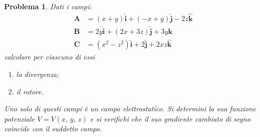\documentclass[a4paper,oneside]{article}
\newtheorem{problema}{Problema}
\renewcommand{\vec}[1]{\mathbf{#1}}
\renewcommand{\hat}[1]{\widehat{\mathbf{#1}}}
\begin{document}
\begin{problema}
	Dati i campi:
	\begin{align*}
	\vec{A} &= (x+y)\hat{i} + (-x+y)\hat{j} - 2z\hat{k}\\
	\vec{B} &= 2y\hat{i} + (2x+3z)\hat{j} + 3y\hat{k}\\
	\vec{C} &= (x^2-z^2)\hat{i} + 2\hat{j} + 2xz\hat{k}
	\end{align*}
	calcolare per ciascuno di essi
	\begin{enumerate}
		\item la divergenza;
		\item il rotore.
	\end{enumerate}
	Uno solo di questi campi è un campo elettrostatico. Si determini la sua funzione
	potenziale $V = V(x,\,y,\,z)$ e si verifichi che il suo gradiente cambiato di segno
	coincide con il suddetto campo.
\end{problema}
\end{document}
